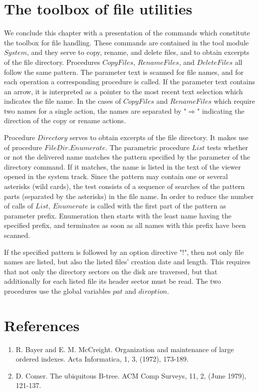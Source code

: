 \section{The toolbox of file utilities}
We conclude this chapter with a presentation of the commands which constitute the toolbox for
file handling. These commands are contained in the tool module $System$, and they serve to copy,
rename, and delete files, and to obtain excerpts of the file directory.
Procedures $CopyFiles$, $RenameFiles$, and $DeleteFiles$ all follow the same pattern. The parameter
text is scanned for file names, and for each operation a corresponding procedure is called. If the
parameter text contains an arrow, it is interpreted as a pointer to the most recent text selection
which indicates the file name. In the cases of $CopyFiles$ and $RenameFiles$ which require two
names for a single action, the names are separated by "$\Rightarrow$" indicating the direction of the copy or
rename actions.

Procedure $Directory$ serves to obtain excerpts of the file directory. It makes use of procedure
$FileDir.Enumerate$. The parametric procedure $List$ tests whether or not the delivered name
matches the pattern specified by the parameter of the directory command. If it matches, the name
is listed in the text of the viewer opened in the system track. Since the pattern may contain one or
several asterisks (wild cards), the test consists of a sequence of searches of the pattern parts
(separated by the asterisks) in the file name. In order to reduce the number of calls of $List$,
$Enumerate$ is called with the first part of the pattern as parameter prefix. Enumeration then starts
with the least name having the specified prefix, and terminates as soon as all names with this
prefix have been scanned.

If the specified pattern is followed by an option directive "!", then not only file names are listed, but
also the listed files' creation date and length. This requires that not only the directory sectors on
the disk are traversed, but that additionally for each listed file its header sector must be read. The
two procedures use the global variables $pat$ and $diroption$.

\section*{References}
\begin{enumerate}
	\item R. Bayer and E. M. McCreight. Organization and maintenance of large ordered indexes. Acta Informatica, 1, 3, (1972), 173-189.

	\item D. Comer. The ubiquitous B-tree. ACM Comp Surveys, 11, 2, (June 1979), 121-137.
\end{enumerate}
